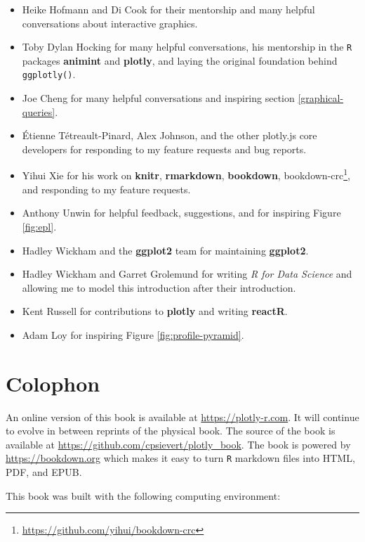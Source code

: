 \documentclass[
  12pt,
]{krantz}
\providecommand{\tightlist}{%
  \setlength{\itemsep}{0pt}\setlength{\parskip}{0pt}}
\renewcommand{\href}[2]{#2\footnote{\url{#1}}}
\begin{document}
\begin{itemize}
\tightlist
\item
  Heike Hofmann and Di Cook for their mentorship and many helpful conversations about interactive graphics.
\item
  Toby Dylan Hocking for many helpful conversations, his mentorship in the \texttt{R} packages \textbf{animint} and \textbf{plotly}, and laying the original foundation behind \texttt{ggplotly()}.
\item
  Joe Cheng for many helpful conversations and inspiring section \ref{graphical-queries}.
\item
  Étienne Tétreault-Pinard, Alex Johnson, and the other plotly.js core developers for responding to my feature requests and bug reports.
\item
  Yihui Xie for his work on \textbf{knitr}, \textbf{rmarkdown}, \textbf{bookdown}, \href{https://github.com/yihui/bookdown-crc}{bookdown-crc}, and responding to my feature requests.
\item
  Anthony Unwin for helpful feedback, suggestions, and for inspiring Figure \ref{fig:epl}.
\item
  Hadley Wickham and the \textbf{ggplot2} team for maintaining \textbf{ggplot2}.
\item
  Hadley Wickham and Garret Grolemund for writing \emph{R for Data Science} and allowing me to model this introduction after their introduction.
\item
  Kent Russell for contributions to \textbf{plotly} and writing \textbf{reactR}.
\item
  Adam Loy for inspiring Figure \ref{fig:profile-pyramid}.
\end{itemize}

\hypertarget{colophon}{%
\section{Colophon}\label{colophon}}

An online version of this book is available at \url{https://plotly-r.com}. It will continue to evolve in between reprints of the physical book. The source of the book is available at \url{https://github.com/cpsievert/plotly_book}. The book is powered by \url{https://bookdown.org} which makes it easy to turn \texttt{R} markdown files into HTML, PDF, and EPUB.

This book was built with the following computing environment:
\end{document}
